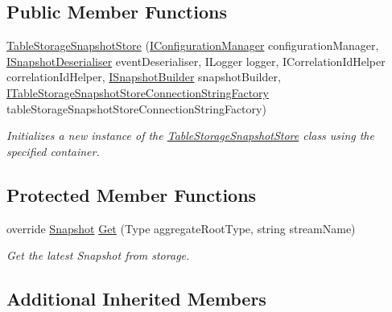 \subsection*{Public Member Functions}
\begin{DoxyCompactItemize}
\item 
\hyperlink{classCqrs_1_1Azure_1_1Storage_1_1Events_1_1TableStorageSnapshotStore_a28cbff6169d91fe7646a1dc32b3cc7c2_a28cbff6169d91fe7646a1dc32b3cc7c2}{Table\+Storage\+Snapshot\+Store} (\hyperlink{interfaceCqrs_1_1Configuration_1_1IConfigurationManager}{I\+Configuration\+Manager} configuration\+Manager, \hyperlink{interfaceCqrs_1_1Events_1_1ISnapshotDeserialiser}{I\+Snapshot\+Deserialiser} event\+Deserialiser, I\+Logger logger, I\+Correlation\+Id\+Helper correlation\+Id\+Helper, \hyperlink{interfaceCqrs_1_1Events_1_1ISnapshotBuilder}{I\+Snapshot\+Builder} snapshot\+Builder, \hyperlink{interfaceCqrs_1_1Azure_1_1BlobStorage_1_1ITableStorageSnapshotStoreConnectionStringFactory}{I\+Table\+Storage\+Snapshot\+Store\+Connection\+String\+Factory} table\+Storage\+Snapshot\+Store\+Connection\+String\+Factory)
\begin{DoxyCompactList}\small\item\em Initializes a new instance of the \hyperlink{classCqrs_1_1Azure_1_1Storage_1_1Events_1_1TableStorageSnapshotStore}{Table\+Storage\+Snapshot\+Store} class using the specified container. \end{DoxyCompactList}\end{DoxyCompactItemize}
\subsection*{Protected Member Functions}
\begin{DoxyCompactItemize}
\item 
override \hyperlink{classCqrs_1_1Snapshots_1_1Snapshot}{Snapshot} \hyperlink{classCqrs_1_1Azure_1_1Storage_1_1Events_1_1TableStorageSnapshotStore_ac552ed9e69ca9ce8bbd9f14b4ecb546f_ac552ed9e69ca9ce8bbd9f14b4ecb546f}{Get} (Type aggregate\+Root\+Type, string stream\+Name)
\begin{DoxyCompactList}\small\item\em Get the latest Snapshot from storage. \end{DoxyCompactList}\end{DoxyCompactItemize}
\subsection*{Additional Inherited Members}


